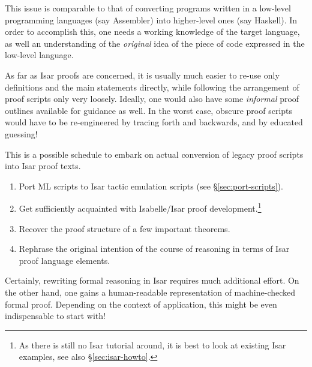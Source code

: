 This issue is comparable to that of converting programs written in a low-level
programming languages (say Assembler) into higher-level ones (say Haskell).
In order to accomplish this, one needs a working knowledge of the target
language, as well an understanding of the \emph{original} idea of the piece of
code expressed in the low-level language.

As far as Isar proofs are concerned, it is usually much easier to re-use only
definitions and the main statements directly, while following the arrangement
of proof scripts only very loosely.  Ideally, one would also have some
\emph{informal} proof outlines available for guidance as well.  In the worst
case, obscure proof scripts would have to be re-engineered by tracing forth
and backwards, and by educated guessing!

\medskip This is a possible schedule to embark on actual conversion of legacy
proof scripts into Isar proof texts.
\begin{enumerate}
\item Port ML scripts to Isar tactic emulation scripts (see
  \S\ref{sec:port-scripts}).
\item Get sufficiently acquainted with Isabelle/Isar proof
  development.\footnote{As there is still no Isar tutorial around, it is best
    to look at existing Isar examples, see also \S\ref{sec:isar-howto}.}
\item Recover the proof structure of a few important theorems.
\item Rephrase the original intention of the course of reasoning in terms of
  Isar proof language elements.
\end{enumerate}

Certainly, rewriting formal reasoning in Isar requires much additional effort.
On the other hand, one gains a human-readable representation of
machine-checked formal proof.  Depending on the context of application, this
might be even indispensable to start with!


